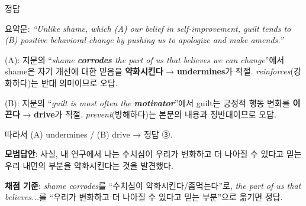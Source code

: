 \documentclass[11pt,a4paper]{article}
\newcommand{\sol}[2]{\vspace{6pt}{\sffamily\bfseries #1} \quad 정답 \fbox{#2}\par\vspace{1pt}}
\begin{document}
\sol{3. 요약문 (A)(B)}{③}
요약문: \textit{``Unlike shame, which (A) our belief in self-improvement, guilt tends to (B) positive behavioral change by pushing us to apologize and make amends.''}
\par\vspace{3pt}
(A): 지문의 ``\textit{shame \textbf{corrodes} the part of us that believes we can change}''에서 shame은 자기 개선에 대한 믿음을 \textbf{약화시킨다} → \textbf{undermines}가 적절. \textit{reinforces}(강화하다)는 반대 의미이므로 오답.
\par\vspace{2pt}
(B): 지문의 ``\textit{guilt is most often the \textbf{motivator}}''에서 guilt는 긍정적 행동 변화를 \textbf{이끈다} → \textbf{drive}가 적절. \textit{prevent}(방해하다)는 본문의 내용과 정반대이므로 오답.
\par\vspace{2pt}
따라서 (A) undermines / (B) drive → 정답 ③.

\vspace{8pt}
\par\textbf{모범답안}: 사실, 내 연구에서 나는 수치심이 우리가 변화하고 더 나아질 수 있다고 믿는 우리 내면의 부분을 약화시킨다는 것을 발견했다.
\par\textbf{채점 기준}: \textit{shame corrodes}를 ``수치심이 약화시킨다/좀먹는다''로, \textit{the part of us that believes...}를 ``우리가 변화하고 더 나아질 수 있다고 믿는 부분''으로 옮기면 정답.
\end{document}
